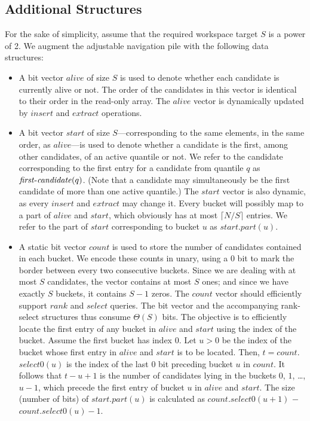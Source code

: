 \documentclass[final,onetabnum,onefignum,onethmnum]{siamltex}
\newcommand{\Insert}{\mbox{$\mathit{insert}$}}
\newcommand{\Extract}{\mbox{$\mathit{extract}$}}
\newcommand{\Rank}{\mbox{$\mathit{rank}$}}
\newcommand{\Select}{\mbox{$\mathit{select}$}}
\newcommand{\FirstCandidate}{\mbox{$\mathit{first}\mbox{\rm -}\mathit{candidate}$}}
\begin{document}
\subsection{Additional Structures} 
For the sake of simplicity, assume that the required workspace target $S$ is
a power of 2.  We augment the adjustable navigation pile with the
following data structures:
\begin{itemize}
\item A bit vector $\mathit{alive}$ of size $S$ is used to denote
  whether each candidate is currently alive or not. The order of the
  candidates in this vector is identical to their order in the read-only
  array. The $\mathit{alive}$ vector is dynamically updated by \Insert{}
  and \Extract{} operations.

\item A bit vector $\mathit{start}$ of size $S$---corresponding to the same
  elements, in the same order, as $\mathit{alive}$---is
  used to denote whether a candidate is the first, among other
  candidates, of an active quantile or not. We refer to the candidate corresponding to the first entry for a  
  candidate from quantile $q$ as $\FirstCandidate(q)$.
	(Note that a candidate may simultaneously be the first candidate of more than one active quantile.) 
	The $\mathit{start}$ vector is also dynamic, as every
  \Insert{} and \Extract{} may change it.  Every bucket will possibly map
  to a part of $\mathit{alive}$ and $\mathit{start}$, which obviously has at
  most $\lceil N/S \rceil$ entries.  We refer to the part of $\mathit{start}$
  corresponding to bucket $u$ as $\mathit{start.part}(u)$.

\item A static bit vector $\mathit{count}$ is used to store the number
  of candidates contained in each bucket. We encode these counts in
  unary, using a $0$ bit to mark the border between every two
  consecutive buckets. Since we are dealing with at most $S$
  candidates, the vector contains at most $S$ ones; and since we have
  exactly $S$ buckets, it contains $S-1$ zeros. The $\mathit{count}$
  vector should efficiently support \Rank{} and \Select{} queries. The
  bit vector and the accompanying rank-select structures thus consume
  $\Theta(S)$ bits.  The objective is to efficiently locate the first
  entry of any bucket in $\mathit{alive}$ and $\mathit{start}$ using the index of the bucket. 
	Assume the first bucket has index $0$. Let $u > 0$ be the index of the bucket whose first
  entry in $\mathit{alive}$ and $\mathit{start}$ is to be located. Then, $t =
  \mathit{count}$.\Select$0(u)$ is the index of the last $0$ bit
  preceding bucket $u$ in $\mathit{count}$.  It follows that $t-u+1$
  is the number of candidates lying in the buckets $0$, $1$, \dots,
  $u-1$, which precede the first entry of bucket $u$ in
  $\mathit{alive}$ and $\mathit{start}$. The size (number of bits)
  of $\mathit{start.part}(u)$ is calculated as 
	$\mathit{count}$.\Select$0(u+1)$ $-$ $\mathit{count}$.\Select$0(u) - 1$.


\end{itemize}
\end{document}
